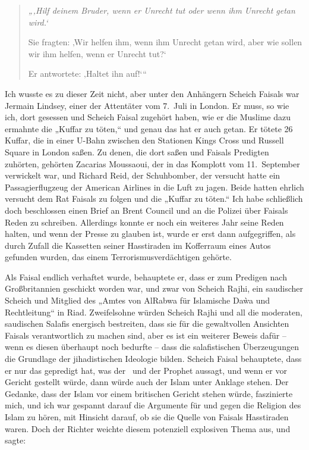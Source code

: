 \documentclass[12pt]{memoir}
\begin{document}
\begin{quote}
\itshape
„‚Hilf deinem Bruder, wenn er Unrecht tut oder wenn ihm Unrecht getan wird.‘

Sie fragten: ‚Wir helfen ihm, wenn ihm Unrecht getan wird,
aber wie sollen wir ihm helfen, wenn er Unrecht tut?‘

Er antwortete: ‚Haltet ihn auf!‘“
\end{quote}

Ich wusste es zu dieser Zeit nicht,
aber unter den Anhängern Scheich Faisals war Jermain Lindsey,
einer der Attentäter vom 7.\ Juli in London.
Er muss, so wie ich, dort gesessen
und Scheich Faisal zugehört haben,
wie er die Muslime dazu ermahnte die „Kuffar zu töten,“
und genau das hat er auch getan.
Er tötete 26 Kuffar, die in einer U-Bahn zwischen den Stationen
Kings Cross und Russell Square in London saßen.
Zu denen, die dort saßen und Faisals Predigten zuhörten,
gehörten Zacarias Moussaoui,
der in das Komplott vom 11.\ September verwickelt war,
und Richard Reid, der Schuhbomber,
der versucht hatte ein Passagierflugzeug der American Airlines
in die Luft zu jagen.
Beide hatten ehrlich versucht dem Rat Faisals zu folgen
und die „Kuffar zu töten.“
Ich habe schließlich doch beschlossen einen Brief
an Brent Council und an die Polizei über Faisals Reden zu schreiben.
Allerdings konnte er noch ein weiteres Jahr seine Reden halten,
und wenn der Presse zu glauben ist,
wurde er erst dann aufgegriffen,
als durch Zufall die Kassetten seiner Hasstiraden
im Kofferraum eines Autos gefunden wurden,
das einem Terrorismusverdächtigen gehörte.

Als Faisal endlich verhaftet wurde, behauptete er,
dass er zum Predigen nach Großbritannien geschickt worden war,
und zwar von Scheich Rajhi,
ein saudischer Scheich und Mitglied des „Amtes von Al\–Rabwa
für Islamische Da\`wa und Rechtleitung“ in Riad.
Zweifelsohne würden Scheich Rajhi und all
die moderaten, saudischen Salafis energisch bestreiten,
dass sie für die gewaltvollen Ansichten Faisals verantwortlich zu machen sind,
aber es ist ein weiterer Beweis dafür –
wenn es diesen überhaupt noch bedurfte –
dass die salafistischen Überzeugungen
die Grundlage der jihadistischen Ideologie bilden.
Scheich Faisal behauptete, dass er nur das gepredigt hat,
was der \Quran\ und der Prophet aussagt,
und wenn er vor Gericht gestellt würde,
dann würde auch der Islam unter Anklage stehen.
Der Gedanke, dass der Islam vor einem britischen Gericht stehen würde,
faszinierte mich, und ich war gespannt darauf die Argumente
für und gegen die Religion des Islam zu hören,
mit Hinsicht darauf, ob sie die Quelle von Faisals Hasstiraden waren.
Doch der Richter weichte diesem potenziell explosiven Thema aus,
und sagte:
\end{document}
